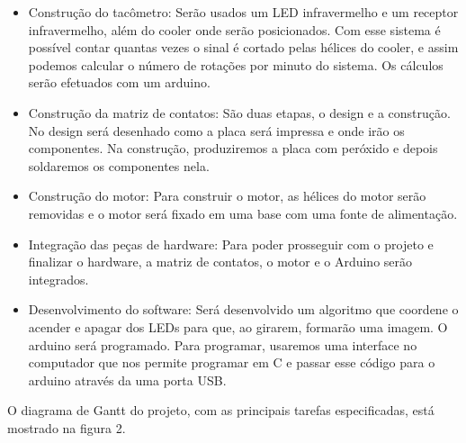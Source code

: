 \begin{itemize}
\item Construção do tacômetro:
Serão usados um LED infravermelho e um receptor infravermelho, além do cooler onde serão posicionados. Com esse sistema é possível contar quantas vezes o sinal é cortado pelas hélices do cooler, e assim podemos calcular o número de rotações por minuto do sistema. Os cálculos serão efetuados com um arduino.
\item Construção da matriz de contatos:
São duas etapas, o design e a construção. No design será desenhado como a placa será impressa e onde irão os componentes. Na construção, produziremos a placa com peróxido e depois soldaremos os componentes nela.
\item Construção do motor:
Para construir o motor, as hélices do motor serão removidas e o motor será fixado em uma base com uma fonte de alimentação.
\item Integração das peças de hardware:
Para poder prosseguir com o projeto e finalizar o hardware, a matriz de contatos, o motor e o Arduino serão integrados.
\item Desenvolvimento do software:
Será desenvolvido um algoritmo que coordene o acender e apagar dos LEDs para que, ao girarem, formarão uma imagem. O arduino será programado. Para programar, usaremos uma interface no computador que nos permite programar em C e passar esse código para o arduino através da uma porta USB.
\end{itemize}

O diagrama de Gantt do projeto, com as principais tarefas especificadas, está mostrado na figura 2.

